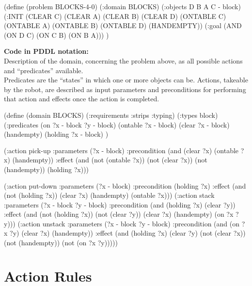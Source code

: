 \begin{python}
(define (problem BLOCKS-4-0)
	(:domain BLOCKS)
	(:objects D B A C - block)
	(:INIT (CLEAR C) (CLEAR A) (CLEAR B) (CLEAR D) 
		(ONTABLE C) (ONTABLE A) (ONTABLE B) 
		(ONTABLE D) (HANDEMPTY))
	(:goal (AND (ON D C) (ON C B) (ON B A)))
)
\end{python}

\bigskip

\begin{footnotesize}
\textbf{Code in PDDL notation:} \\
Description of the domain, concerning the problem above, as all possible actions and \enquote{predicates} available. \\
Predicates are the \enquote{states} in which one or more objects can be. Actions, takeable by the robot, are described as input parameters and preconditions for performing that action and effects once the action is completed. 
\end{footnotesize}

\begin{python}
(define (domain BLOCKS)
  (:requirements :strips :typing)
  (:types block)
  (:predicates (on ?x - block ?y - block)
	       (ontable ?x - block)
	       (clear ?x - block)
	       (handempty)
	       (holding ?x - block)
	       )

  (:action pick-up
	     :parameters (?x - block)
	     :precondition (and (clear ?x) (ontable ?x) 
  			     (handempty))
	     :effect
	     (and (not (ontable ?x))
		   (not (clear ?x))
		   (not (handempty))
		   (holding ?x)))

  (:action put-down
	     :parameters (?x - block)
	     :precondition (holding ?x)
	     :effect
	     (and (not (holding ?x))
		   (clear ?x)
		   (handempty)
		   (ontable ?x)))
  (:action stack
	     :parameters (?x - block ?y - block)
	     :precondition (and (holding ?x) (clear ?y))
	     :effect
	     (and (not (holding ?x))
		   (not (clear ?y))
		   (clear ?x)
		   (handempty)
		   (on ?x ?y)))
  (:action unstack
	     :parameters (?x - block ?y - block)
	     :precondition (and (on ?x ?y) (clear ?x) 
			     (handempty))
	     :effect
	     (and (holding ?x)
		   (clear ?y)
		   (not (clear ?x))
		   (not (handempty))
		   (not (on ?x ?y)))))
\end{python}


\section{Action Rules}\label{sec:action_atomese}

